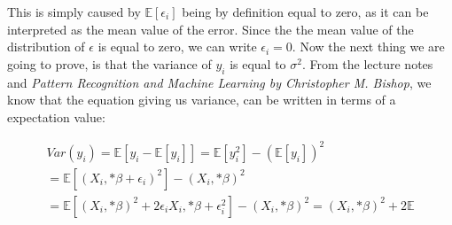 \documentclass[a4paper, 10pt]{article}
\begin{document}
This is simply caused by $\mathbb{E}[\epsilon_i]$ being by definition equal to zero, as it can be interpreted as the mean value of the error. Since the the mean value of the distribution of $\epsilon$ is equal to zero, we can write $\epsilon_i=0$. Now the next thing we are going to prove, is that the variance of $y_i$ is equal to $\sigma^2$. From the lecture notes and \emph{Pattern Recognition and Machine Learning by Christopher M. Bishop}, we know that the equation giving us variance, can be written in terms of a expectation value: 

\begin{gather*}
			Var(y_i) = \mathbb{E}[y_i - \mathbb{E}[y_i]] = \mathbb{E}[y_i^2] - (\mathbb{E}[y_i])^2 \\
										= \mathbb{E}[(X_i,*\beta + \epsilon_i)^2] - (X_i,*\beta)^2 \\
										= \mathbb{E}[(X_i,*\beta)^2 + 2\epsilon_iX_i,*\beta + \epsilon_i^2] - (X_i,*\beta)^2
										= (X_i,*\beta)^2 + 2\mathbb{E}
\end{gather*}
\end{document}
